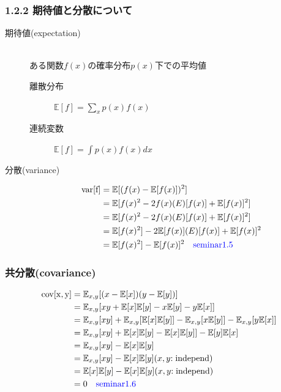 \documentclass[dvipdfmx]{beamer}
\theoremstyle{definition}
\begin{document}
\begin{frame}
  \frametitle{1.2.2 期待値と分散について}
  \begin{description}
    \item[期待値(expectation)] \hfill \\
      ある関数$f(x)$の確率分布$p(x)$下での平均値
    \begin{description}
      \item[離散分布] $\mathbb{E}[f] = \sum_{x} p(x)f(x)$
      \item[連続変数] $\mathbb{E}[f] = \int p(x)f(x)dx$
    \end{description}
    \item[分散(variance)]
    \begin{align*}
      \rm{var}[f] &= \mathbb{E}[(f(x)-\mathbb{E}[f(x)])^2] \\
                  &= \mathbb{E}[f(x)^2 -2f(x)\mathbb(E)[f(x)]  + \mathbb{E}[f(x)]^2] \\
                  &= \mathbb{E}[f(x)^2 -2f(x)\mathbb(E)[f(x)]  + \mathbb{E}[f(x)]^2] \\
                  &= \mathbb{E}[f(x)^2] -2\mathbb{E}[f(x)]\mathbb(E)[f(x)]  + \mathbb{E}[f(x)]^2 \\
                  &= \mathbb{E}[f(x)^2] -\mathbb{E}[f(x)]^2 \quad \textcolor{blue}{\rm{seminar1.5}}
    \end{align*}
  \end{description}
\end{frame}

\begin{frame}
  \frametitle{共分散(covariance)}
    \begin{align*}
      \rm{cov}[x,y] &= \mathbb{E}_{x,y}[(x-\mathbb{E}[x])(y-\mathbb{E}[y])] \\
                    &= \mathbb{E}_{x,y}[xy + \mathbb{E}[x]\mathbb{E}[y] -x\mathbb{E}[y] -y\mathbb{E}[x]] \\
                    &= \mathbb{E}_{x,y}[xy] +\mathbb{E}_{x,y}[\mathbb{E}[x]\mathbb{E}[y]] -\mathbb{E}_{x,y}[x\mathbb{E}[y]] -\mathbb{E}_{x,y}[y\mathbb{E}[x]] \\
                    &= \mathbb{E}_{x,y}[xy] +\mathbb{E}[x]\mathbb{E}[y] -\mathbb{E}[x]\mathbb{E}[y]] -\mathbb{E}[y]\mathbb{E}[x] \\
                    &= \mathbb{E}_{x,y}[xy] -\mathbb{E}[x]\mathbb{E}[y] \\
                    &= \mathbb{E}_{x,y}[xy] -\mathbb{E}[x]\mathbb{E}[y] (x,y \rm{:independ})\\
                    &= \mathbb{E}[x]\mathbb{E}[y] -\mathbb{E}[x]\mathbb{E}[y] (x,y \rm{:independ})\\
                    &= 0 \quad \textcolor{blue}{\rm{seminar1.6}}
    \end{align*}
\end{frame}
\end{document}
